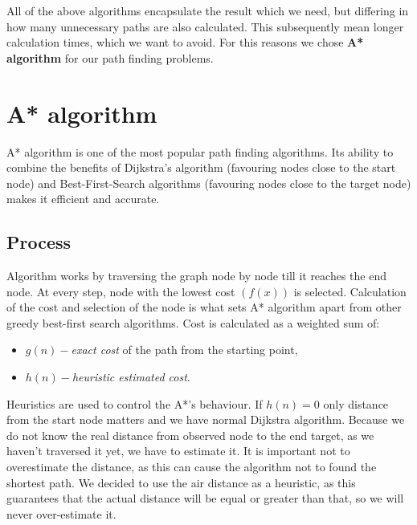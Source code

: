 All of the above algorithms encapsulate the result which we need, but differing in how many unnecessary paths are also calculated. This subsequently mean longer calculation times, which we want to avoid. For this reasons we chose \textbf{A* algorithm} for our path finding problems.

\section{A* algorithm}
A* algorithm is one of the most popular path finding algorithms. Its ability to combine the benefits of Dijkstra's algorithm (favouring nodes close to the start node) and Best-First-Search algorithms (favouring nodes close to the target node) makes it efficient and accurate. 
\subsection{Process}
Algorithm works by traversing the graph node by node till it reaches the end node. At every step, node with the lowest cost $(f(x))$ is selected. Calculation of the cost and selection of the node is what sets A* algorithm apart from other greedy best-first search algorithms. Cost is calculated as a weighted sum of:
\begin{itemize}
\item $g(n) - $\textit{exact cost} of the path from the starting point,
\item $h(n) - $\textit{heuristic estimated cost}.
\end{itemize}
Heuristics are used to control the A*'s behaviour. If $h(n)=0$ only distance from the start node matters and we have normal Dijkstra algorithm. Because we do not know the real distance from observed node to the end target, as we haven't traversed it yet, we have to estimate it. It is important not to overestimate the distance, as this can cause the algorithm not to found the shortest path. We decided to use the air distance as a heuristic, as this guarantees that the actual distance will be equal or greater than that, so we will never over-estimate it.

